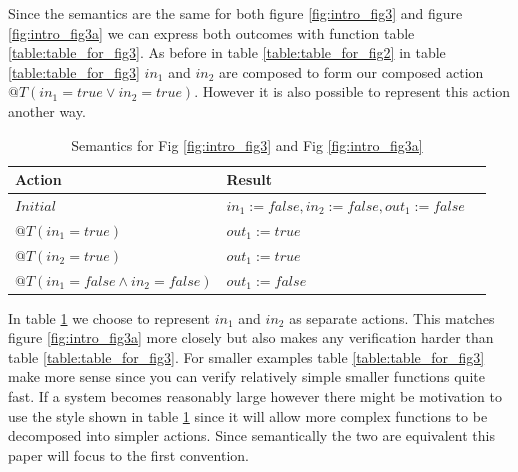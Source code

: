 Since the semantics are the same for both figure \ref{fig:intro_fig3} and figure \ref{fig:intro_fig3a} we can
express both outcomes with function table \ref{table:table_for_fig3}.
As before in table \ref{table:table_for_fig2} in table \ref{table:table_for_fig3} $in_1$ and $in_2$ are composed to form our composed action $@T(in_1 = true \vee in_2 = true)$. However it is also possible to represent this action another way.

\begin{table}[h]
    \centering
       \begin{tabular}{|l|l|l|}
        \hline
        Action & Result \\
        \hline
        $Initial$ &$in_1 := false, in_2 := false, out_1 := false$\\
        \hline
        $@T(in_1 = true)$ & $out_1 := true$ \\
        \hline
        $@T(in_2 = true)$ & $out_1 := true$ \\
        \hline
        $@T(in_1 = false \wedge in_2 = false)$ & $out_1 := false$\\
        \hline
    \end{tabular}
    \caption{Semantics for Fig \ref{fig:intro_fig3} and Fig \ref{fig:intro_fig3a}}
    \label{table:table_for_fig3a}
\end{table}

In table \ref{table:table_for_fig3a} we choose to represent $in_1$ and $in_2$ as separate actions. This matches figure
\ref{fig:intro_fig3a} more closely but also makes any verification harder than table \ref{table:table_for_fig3}. For
smaller examples table \ref{table:table_for_fig3} make more sense since you can verify relatively simple smaller functions
quite fast. If a system becomes reasonably large however there might be motivation to use the style shown in 
table \ref{table:table_for_fig3a} since it will allow more complex functions to be decomposed into simpler actions.
Since semantically the two are equivalent this paper will focus to the first convention.


